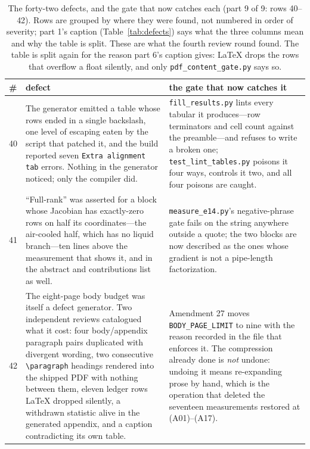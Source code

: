 \documentclass{article}
\begin{document}
\begin{table}[p]
\centering
\small\sloppy
\setlength{\tabcolsep}{4pt}
\begin{tabular}{@{}p{0.6cm}p{7.3cm}p{7.3cm}@{}}
\toprule
\# & defect & the gate that now catches it \\
\midrule
40 & The generator emitted a table whose rows ended in a single backslash, one level of escaping eaten by the script that patched it, and the build reported seven \texttt{Extra alignment tab} errors.  Nothing in the generator noticed; only the compiler did. & \texttt{fill\_results.py} lints every tabular it produces---row terminators and cell count against the preamble---and refuses to write a broken one; \texttt{test\_lint\_tables.py} poisons it four ways, controls it two, and all four poisons are caught. \\
41 & ``Full-rank'' was asserted for a block whose Jacobian has exactly-zero rows on half its coordinates---the air-cooled half, which has no liquid branch---ten lines above the measurement that shows it, and in the abstract and contributions list as well. & \texttt{measure\_e14.py}'s negative-phrase gate fails on the string anywhere outside a quote; the two blocks are now described as the ones whose gradient is not a pipe-length factorization. \\
42 & The eight-page body budget was itself a defect generator.  Two independent reviews catalogued what it cost: four body/appendix paragraph pairs duplicated with divergent wording, two consecutive \texttt{\textbackslash paragraph} headings rendered into the shipped PDF with nothing between them, eleven ledger rows LaTeX dropped silently, a withdrawn statistic alive in the generated appendix, and a caption contradicting its own table. & Amendment 27 moves \texttt{BODY\_PAGE\_LIMIT} to nine with the reason recorded in the file that enforces it.  The compression already done is \emph{not} undone: undoing it means re-expanding prose by hand, which is the operation that deleted the seventeen measurements restored at (A01)--(A17). \\
\bottomrule
\end{tabular}
\caption{The forty-two defects, and the gate that now catches each (part 9 of 9: rows 40--42).  Rows are grouped by where they were found, not numbered in order of severity; part 1's caption (Table~\ref{tab:defects}) says what the three columns mean and why the table is split.  These are what the fourth review round found.  The table is split again for the reason part 6's caption gives: LaTeX drops the rows that overflow a float silently, and only \texttt{pdf\_content\_gate.py} says so.}
\label{tab:defectsi}
\end{table}
\end{document}
